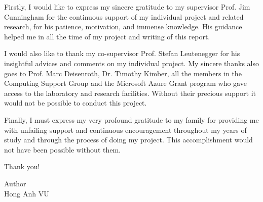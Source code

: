 Firstly, I would like to express my sincere gratitude to my supervisor Prof. Jim Cunningham for the continuous support of my individual project and related research, for his patience, motivation, and immense knowledge. His guidance helped me in all the time of my project and writing of this report.
 
I would also like to thank my co-supervisor Prof. Stefan Leutenegger for his insightful advices and comments on my individual project. My sincere thanks also goes to Prof. Marc Deisenroth, Dr. Timothy Kimber, all the members in the Computing Support Group and the Microsoft Azure Grant program who gave access to the laboratory and research facilities. Without their precious support it would not be possible to conduct this project.

Finally, I must express my very profound gratitude to my family for providing me with unfailing support and continuous encouragement throughout my years of study and through the process of doing my project. This accomplishment would not have been possible without them. 

Thank you!

Author\\
Hong Anh VU



